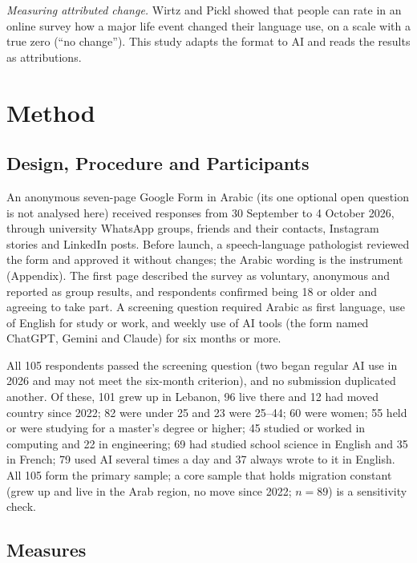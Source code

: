 \documentclass[conference]{IEEEtran}
\begin{document}
\emph{Measuring attributed change.} Wirtz and Pickl \cite{wirtz2025} showed that people can rate in an online survey how a major life event changed their language use, on a scale with a true zero (``no change''). This study adapts the format to AI and reads the results as attributions.

\section{Method}

\subsection{Design, Procedure and Participants}

An anonymous seven-page Google Form in Arabic (its one optional open question is not analysed here) received responses from 30 September to 4 October 2026, through university WhatsApp groups, friends and their contacts, Instagram stories and LinkedIn posts. Before launch, a speech-language pathologist reviewed the form and approved it without changes; the Arabic wording is the instrument (Appendix). The first page described the survey as voluntary, anonymous and reported as group results, and respondents confirmed being 18 or older and agreeing to take part. A screening question required Arabic as first language, use of English for study or work, and weekly use of AI tools (the form named ChatGPT, Gemini and Claude) for six months or more.

All 105 respondents passed the screening question (two began regular AI use in 2026 and may not meet the six-month criterion), and no submission duplicated another. Of these, 101 grew up in Lebanon, 96 live there and 12 had moved country since 2022; 82 were under 25 and 23 were 25--44; 60 were women; 55 held or were studying for a master's degree or higher; 45 studied or worked in computing and 22 in engineering; 69 had studied school science in English and 35 in French; 79 used AI several times a day and 37 always wrote to it in English. All 105 form the primary sample; a core sample that holds migration constant (grew up and live in the Arab region, no move since 2022; $n=89$) is a sensitivity check.

\subsection{Measures}
\end{document}

